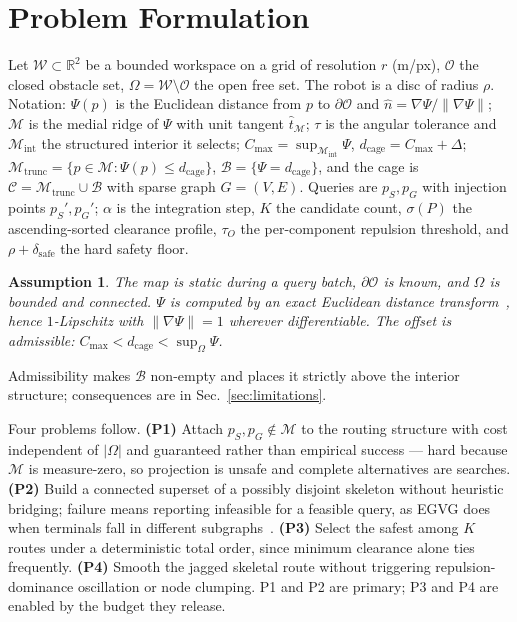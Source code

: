 \documentclass[conference]{IEEEtran}
\newtheorem{assumption}{Assumption}
\begin{document}
\section{Problem Formulation}
\label{sec:problem}

Let $\mathcal{W}\subset\mathbb{R}^2$ be a bounded workspace on a grid of resolution $r$ (m/px), $\mathcal{O}$ the closed obstacle set, $\Omega=\mathcal{W}\setminus\mathcal{O}$ the open free set. The robot is a disc of radius $\rho$. Notation: $\Psi(p)$ is the Euclidean distance from $p$ to $\partial\mathcal{O}$ and $\hat{n}=\nabla\Psi/\|\nabla\Psi\|$; $\mathcal{M}$ is the medial ridge of $\Psi$ with unit tangent $\hat{t}_{\mathcal{M}}$; $\tau$ is the angular tolerance and $\mathcal{M}_{\mathrm{int}}$ the structured interior it selects; $C_{\max}=\sup_{\mathcal{M}_{\mathrm{int}}}\Psi$, $d_{\mathrm{cage}}=C_{\max}+\Delta$; $\mathcal{M}_{\mathrm{trunc}}=\{p\in\mathcal{M}:\Psi(p)\le d_{\mathrm{cage}}\}$, $\mathcal{B}=\{\Psi=d_{\mathrm{cage}}\}$, and the cage is $\mathcal{C}=\mathcal{M}_{\mathrm{trunc}}\cup\mathcal{B}$ with sparse graph $G=(V,E)$. Queries are $p_S,p_G$ with injection points $p_S',p_G'$; $\alpha$ is the integration step, $K$ the candidate count, $\sigma(P)$ the ascending-sorted clearance profile, $\tau_O$ the per-component repulsion threshold, and $\rho+\delta_{\mathrm{safe}}$ the hard safety floor.

\begin{assumption}
\label{asm:setting}
The map is static during a query batch, $\partial\mathcal{O}$ is known, and $\Omega$ is bounded and connected. $\Psi$ is computed by an exact Euclidean distance transform~\cite{felzenszwalb2012}, hence $1$-Lipschitz with $\|\nabla\Psi\|=1$ wherever differentiable. The offset is admissible: $C_{\max}<d_{\mathrm{cage}}<\sup_{\Omega}\Psi$.
\end{assumption}

Admissibility makes $\mathcal{B}$ non-empty and places it strictly above the interior structure; consequences are in Sec.~\ref{sec:limitations}.

Four problems follow. \textbf{(P1)} Attach $p_S,p_G\notin\mathcal{M}$ to the routing structure with cost independent of $|\Omega|$ and guaranteed rather than empirical success --- hard because $\mathcal{M}$ is measure-zero, so projection is unsafe and complete alternatives are searches. \textbf{(P2)} Build a connected superset of a possibly disjoint skeleton without heuristic bridging; failure means reporting infeasible for a feasible query, as EGVG does when terminals fall in different subgraphs~\cite{qi2025egvg}. \textbf{(P3)} Select the safest among $K$ routes under a deterministic total order, since minimum clearance alone ties frequently. \textbf{(P4)} Smooth the jagged skeletal route without triggering repulsion-dominance oscillation or node clumping. P1 and P2 are primary; P3 and P4 are enabled by the budget they release.
\end{document}
